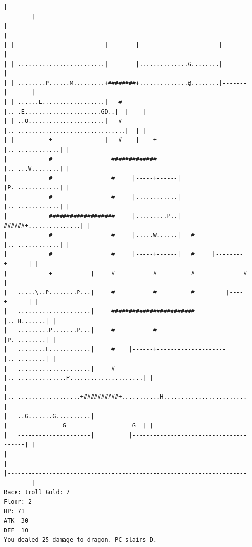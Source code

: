\documentclass[11pt]{article}
\theoremstyle{plain}
\begin{document}
\begin{Verbatim}[fontsize=\scriptsize]
|-----------------------------------------------------------------------------|
|                                                                             |
| |--------------------------|        |-----------------------|               |
| |..........................|        |..............G........|               |
| |.........P......M.........+########+..............@........|-------|       |
| |.......L..................|   #    |....E......................GD..|--|    |
| |...O......................|   #    |..................................|--| |
| |----------+---------------|   #    |----+----------------|...............| |
|            #                 #############                |......W........| |
|            #                 #     |-----+------|         |P..............| |
|            #                 #     |............|         |...............| |
|            ###################     |.........P..|   ######+...............| |
|            #                 #     |.....W......|   #     |...............| |
|            #                 #     |-----+------|   #     |--------+------| |
|  |---------+-----------|     #           #          #              #        |
|  |.....\..P........P...|     #           #          #         |----+------| |
|  |.....................|     ########################         |...H.......| |
|  |.........P.......P...|     #           #                    |P..........| |
|  |........L............|     #    |------+--------------------|...........| |
|  |.....................|     #    |.................P.....................| |
|  |.....................+##########+...........H...........................| |
|  |..G.......G..........|          |................G...................G..| |
|  |---------------------|          |---------------------------------------| |
|                                                                             |
|-----------------------------------------------------------------------------|
Race: troll Gold: 7                                                    Floor: 2
HP: 71
ATK: 30
DEF: 10
You dealed 25 damage to dragon. PC slains D.
\end{Verbatim}
\end{document}
